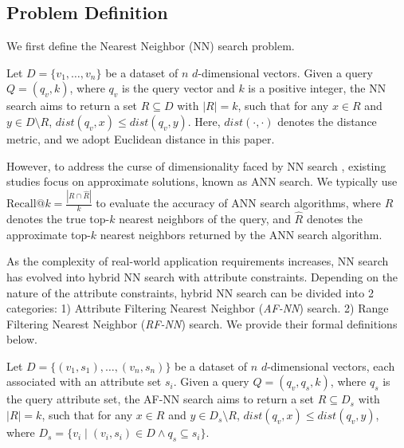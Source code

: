 \documentclass[sigconf, nonacm]{acmart}
\begin{document}
	\subsection{Problem Definition}
	
	We first define the Nearest Neighbor (NN) search problem.
	
	\begin{definition}[NN Search]
		
		Let \( D = \{v_1, \ldots, v_n\} \) be a dataset of \( n \) \( d \)-dimensional vectors. Given a query \( Q = (q_v, k) \), where \( q_v \) is the query vector and \( k \) is a positive integer, the NN search aims to return a set \( R \subseteq D \) with \( |R| = k \), such that for any \( x \in R \) and \( y \in D \setminus R \), \( \textit{dist}\!\left(q_v, x\right) \leq \textit{dist}\!\left(q_v, y\right) \). Here, \( \textit{dist}\!\left(\cdot, \cdot\right) \) denotes the distance metric, and we adopt Euclidean distance in this paper.
	\end{definition}
	
	However, to address the curse of dimensionality faced by NN search \cite{dimcurse}, existing studies focus on approximate solutions, known as ANN  search. We typically use $\text{Recall}@k = \frac{|R \cap \hat{R}|}{k}$ to evaluate the accuracy of ANN search algorithms, where $R$ denotes the true top-$k$ nearest neighbors of the query, and $\hat{R}$ denotes the approximate top-$k$ nearest neighbors returned by the ANN search algorithm.
	
	As the complexity of real-world application requirements increases, NN search has evolved into hybrid NN search with attribute constraints. Depending on the nature of the attribute constraints, hybrid NN search can be divided into 2 categories: 1) Attribute Filtering Nearest Neighbor (\textit{AF-NN}) search. 2) Range Filtering Nearest Neighbor (\textit{RF-NN}) search. We provide their formal definitions below.
	
	\begin{definition}[AF-NN Search]
		Let \( D = \{(v_1, s_1), \ldots, (v_n, s_n)\} \) be a dataset of \( n \) \( d \)-dimensional vectors, each associated with an attribute set \( s_i \). Given a query \( Q = (q_v, q_s, k) \), where \( q_s \) is the query attribute set, the AF-NN search aims to return a set \( R \subseteq D_s \) with \( |R| = k \), such that for any \( x \in R \) and \( y \in D_s \setminus R \), \( \textit{dist}(q_v, x) \leq \textit{dist}(q_v, y) \), where \( D_s = \{ v_i \mid (v_i, s_i) \in D \land q_s \subseteq s_i \} \).
	\end{definition}
	
\end{document}
